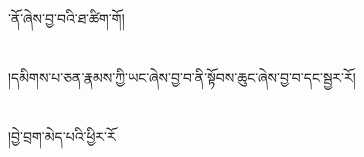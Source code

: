 ་ནོ་ཞེས་བྱ་བའི་ཐ་ཚིག་གོ།\chapter{ }།དམིགས་པ་ཅན་རྣམས་ཀྱི་ཡང་ཞེས་བྱ་བ་ནི་སྟོབས་ཆུང་ཞེས་བྱ་བ་དང་སྦྱར་རོ།\chapter{ }།བྱེ་བྲག་མེད་པའི་ཕྱིར་རོ